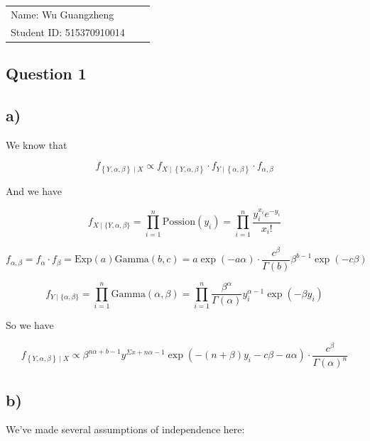 \documentclass[12pt]{article}
\begin{document}
\vfill
\begin{large}

\begin{table}[h!]
\flushleft
\begin{tabular}{lll}
Name: Wu Guangzheng \hspace*{2em}\\
Student ID: 515370910014

\end{tabular}
\end{table}
\end{large}
\newpage
\begin{flushleft}


\section{Question 1} 

\subsection*{a)}

\qquad We know that

$$
f_{\left\{Y, \alpha, \beta\right\}\mid X} \propto f_{X\mid \left\{Y, \alpha, \beta\right\}}\cdot f_{Y\mid\left\{ \alpha, \beta\right\}} \cdot f_{\alpha, \beta}
$$

\qquad And we have

$$
f_{X\mid \{Y, \alpha, \beta\}} = \prod_{i=1}^{n} \text{Possion}(y_i) = \prod_{i=1}^{n} \frac{y_i^{x_i}e^{-y_i}}{x_i !}
$$

$$
f_{\alpha, \beta} = f_{\alpha} \cdot f_{\beta} = \text{Exp}(a)\text{Gamma}(b, c) = a\exp(-a\alpha)\cdot \frac{c^{\beta}}{\Gamma(b)}\beta^{b-1}\exp(-c\beta)
$$

$$
f_{Y\mid \{\alpha, \beta\}} = \prod_{i=1}^n\text{Gamma}(\alpha, \beta) = \prod_{i=1}^n\frac{\beta^{\alpha}}{\Gamma(\alpha)}y_i^{\alpha-1}\exp(-\beta y_i)
$$

\qquad So we have

$$
f_{\left\{Y, \alpha, \beta\right\}\mid X} \propto \beta^{n\alpha + b -1}y^{\Sigma x + n\alpha -1} \exp(-(n+\beta)y_i - c\beta - a\alpha) \cdot \frac{c^{\beta}}{\Gamma(\alpha)^n}
$$

\subsection*{b)}

\qquad We've made several assumptions of independence here:


\end{flushleft}
\end{document}

